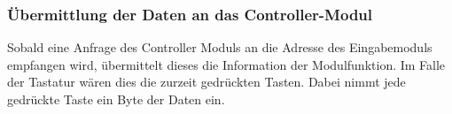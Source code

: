 

\subsubsection{Übermittlung der Daten an das Controller-Modul}
Sobald eine Anfrage des Controller Moduls an die Adresse des Eingabemoduls empfangen wird, übermittelt dieses die Information der Modulfunktion. Im Falle der Tastatur wären dies die zurzeit gedrückten Tasten. Dabei nimmt   jede gedrückte Taste ein Byte der Daten ein. 
